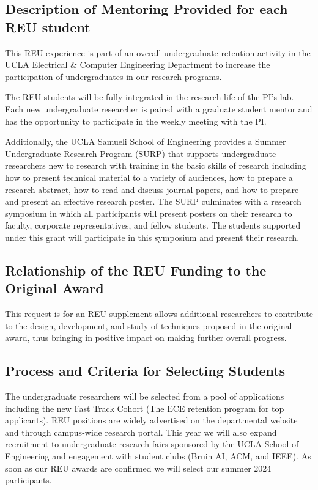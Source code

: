 \subsection*{Description of Mentoring Provided for each REU student}

This REU experience is part of an overall undergraduate retention activity in the UCLA Electrical \& Computer Engineering Department to increase the participation of undergraduates in our research programs.   

The REU students will be fully integrated in the research life of the PI's lab. 
Each new undergraduate researcher is paired with a graduate student mentor and has the opportunity to participate in the weekly meeting with the PI.

Additionally, the UCLA Samueli School of Engineering provides a Summer Undergraduate Research Program (SURP) that supports undergraduate researchers new to research with training in the basic skills of research including how to present technical material to a variety of audiences, how to prepare a research abstract, how to read and discuss journal papers, and how to prepare and present an effective research poster.
The SURP culminates with a research symposium in which all participants will present posters on their research to faculty, corporate representatives, and fellow students. 
The students supported under this grant will participate in this symposium and present their research.

\subsection*{Relationship of the REU Funding to the Original Award}

This request is for an REU supplement allows additional researchers to contribute to the design, development, and study of techniques proposed in the original award, thus bringing in positive impact on making further overall progress.

\subsection*{Process and Criteria for Selecting Students}

The undergraduate researchers will be selected from a pool of applications including the new Fast Track Cohort (The ECE retention program for top applicants). 
REU positions are widely advertised on the departmental website and through campus-wide research portal.  
This year we will also expand recruitment to undergraduate research fairs sponsored by the UCLA School of Engineering and engagement with student clubs (\eg Bruin AI, ACM, and IEEE).
As soon as our REU awards are confirmed we will select our summer 2024 participants.

